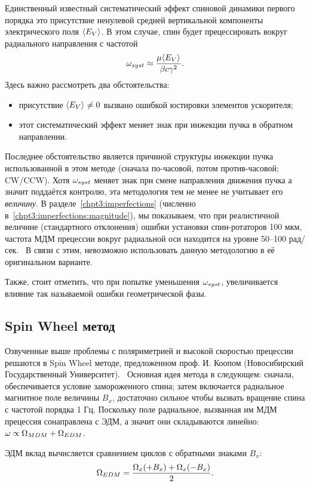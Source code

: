 Единственный известный систематический эффект спиновой динамики
первого порядка это присутствие ненулевой средней вертикальной
компоненты электрического поля $\avg{E_V}$. В этом случае, спин будет
прецессировать вокруг радиального направления с частотой~\cite[стр.~11]{BNL:Deuteron2008}
\[
\w_{syst} \approx \frac{\mu\avg{E_V}}{\beta c\gamma^2}.
\]
Здесь важно рассмотреть два обстоятельства:
\begin{itemize}
\item присутствие $\avg{E_V}\neq 0$ вызвано ошибкой юстировки
  элементов ускорителя;
\item этот систематический эффект меняет знак при инжекции пучка в
  обратном направлении.
\end{itemize}
Последнее обстоятельство является причиной структуры инжекции пучка
использованной в этом методе (сначала по-часовой, потом
против-часовой; CW/CCW). Хотя $\omega_{syst}$ меняет знак при смене
направления движения пучка а значит поддаётся контролю, эта методология тем не менее не учитывает
его \emph{величину}. В разделе~\ref{chpt3:imperfections} (численно в~\ref{chpt3:imperfections:magnitude}), 
мы показываем, что при реалистичной величине (стандартного отклонения) ошибки установки
спин-ротаторов 100 мкм, частота МДМ прецессии вокруг радиальной оси
находится на уровне 50--100 рад/сек.~\cite{Senichev:FDM} В связи с
этим, невозможно использовать данную методологию в её оригинальном варианте.

Также, стоит отметить, что при попытке уменьшения $\omega_{syst}$, увеличивается влияние
так называемой ошибки геометрической фазы.~\cite[стр.~6]{BNL:Proton}

\subsection{Spin Wheel метод}
Озвученные выше проблемы с поляриметрией и высокой скоростью прецессии
решаются в Spin Wheel методе, предложенном проф. И. Коопом
(Новосибирский Государственный Университет).~\cite{Koop:SpinWheel} Основная идея метода в
следующем: сначала, обеспечивается условие замороженного спина; затем
включается радиальное магнитное поле величины $B_x$, достаточно сильное чтобы
вызвать вращение спина с частотой порядка 1 Гц. Поскольку поле
радиальное, вызванная им МДМ прецессия сонаправлена с ЭДМ, а значит
они складываются линейно: $\omega \propto \Omega_{MDM} + \Omega_{EDM}$.

ЭДМ вклад вычисляется сравнением циклов с обратными знаками $B_x$:~\cite[стр.~1963]{Koop:SpinWheel}
\[
\Omega_{EDM} = \frac{\Omega_x(+B_x) + \Omega_x(-B_x)}{2}.
\]

